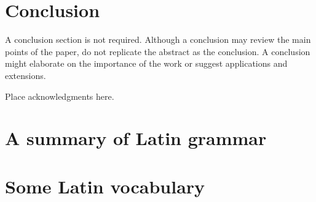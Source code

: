 \documentclass{ifacconf}
\begin{document}
\section{Conclusion}

A conclusion section is not required. Although a conclusion may review
the main points of the paper, do not replicate the abstract as the
conclusion. A conclusion might elaborate on the importance of the work
or suggest applications and extensions.

\begin{ack}
Place acknowledgments here.
\end{ack}

                                                   







\appendix
\section{A summary of Latin grammar}    %
\section{Some Latin vocabulary}              %
\end{document}

